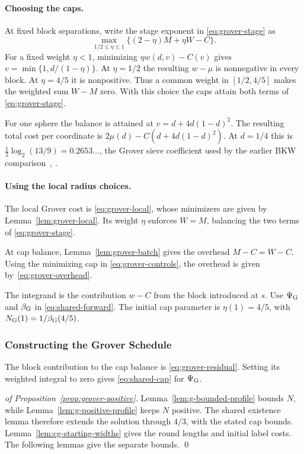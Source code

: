 \documentclass[runningheads,envcountsame,envcountsect,orivec]{llncs}
\begin{document}
\paragraph{Choosing the caps.}
At fixed block separations, write the stage exponent in
\eqref{eq:grover-stage} as
\[
 \max_{1/2\le\eta\le1}\{(2-\eta)M+\eta W-C\}.
\]
For a fixed weight $\eta<1$, minimizing
$\eta w(d,v)-C(v)$ gives
$v=\min\{1,d/(1-\eta)\}$.
At $\eta=1/2$ the resulting
$w-\mu$ is nonnegative in every block. At $\eta=4/5$
it is nonpositive. Thus a common weight in $[1/2,4/5]$
makes the weighted sum $W-M$ zero. With this choice the
caps attain both terms of \eqref{eq:grover-stage}.

For one sphere the balance is attained at
$v=d+4d(1-d)^2$. The resulting total cost per coordinate is
$2\mu(d)-C(d+4d(1-d)^2)$.
At $d=1/4$ this is $\tfrac12\log_2(13/9)=0.2653\ldots$,
the Grover sieve coefficient used by the earlier BKW
comparison~\cite[Section~14.2.10]{Laa16},
\cite[Section~V]{M19}.

\paragraph{Using the local radius choices.}
The local Grover cost is \eqref{eq:grover-local}, whose
minimizers are given by Lemma~\ref{lem:grover-local}.
Its weight $\eta$ enforces $W=M$, balancing the two terms of
\eqref{eq:grover-stage}.


At cap balance, Lemma~\ref{lem:grover-batch} gives
the overhead $M-C=W-C$. Using the minimizing cap in
\eqref{eq:grover-controls}, the overhead is given by~\eqref{eq:grover-overhead}.

The integrand is the contribution $w-C$ from the block introduced at $s$.
Use $\Psi_{\rm G}$ and $\beta_{\rm G}$ in
\eqref{eq:shared-forward}. The initial cap parameter is
$\eta(1)=4/5$, with
$N_{\rm G}(1)=1/\beta_{\rm G}(4/5)$.


\subsubsection{Constructing the Grover Schedule}


The block contribution to the cap balance is
\eqref{eq:grover-residual}. Setting its weighted integral to
zero gives \eqref{eq:shared-cap} for $\Psi_{\rm G}$.



\begin{proof}[of Proposition~\ref{prop:grover-positive}]
Lemma~\ref{lem:g-bounded-profile} bounds $N$, while
Lemma~\ref{lem:g-positive-profile} keeps $N$ positive. The shared existence lemma therefore
extends the solution through $4/3$, with the stated cap bounds.
Lemma~\ref{lem:cg-starting-widths} gives the
round lengths and initial label costs. The following lemmas give the separate bounds.
\qed
\end{proof}
\end{document}
